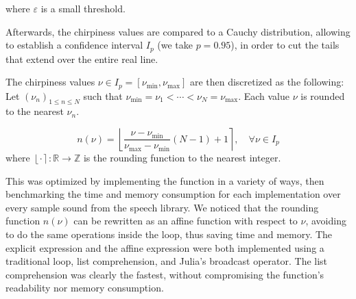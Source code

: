 \documentclass[
  american,
]{article}
\begin{document}
where \(\varepsilon\) is a small threshold.

Afterwards, the chirpiness values are compared to a Cauchy distribution, allowing to establish
a confidence interval \(I_p\) (we take \(p=0.95\)), in order to cut the tails that extend
over the entire real line.

The chirpiness values \(\nu\in I_p=[\nu_{\min},\nu_{\max}]\) are then discretized as the following:
Let \((\nu_n)_{1\leq n\leq N}\) such that \(\nu_{\min}=\nu_1<\cdots<\nu_N=\nu_{\max}\).
Each value \(\nu\) is rounded to the nearest \(\nu_n\).

\begin{equation}
n(\nu) = \left\lfloor\frac{\nu - \nu_{\min}}{\nu_{\max}- \nu_{\min}}(N-1) + 1\right\rceil,\quad\forall\nu\in I_p
\end{equation}
where \(\left\lfloor\cdot\right\rceil:\mathbb{R}\rightarrow\mathbb{Z}\) is the rounding function to the nearest integer.

This was optimized by implementing the function in a variety of ways,
then benchmarking the time and memory consumption for each implementation
over every sample sound from the speech library.
We noticed that the rounding function \(n(\nu)\) can be rewritten
as an affine function with respect to \(\nu\), avoiding to do the same
operations inside the loop, thus saving time and memory.
The explicit expression and the affine expression were both implemented
using a traditional loop, list comprehension, and Julia's broadcast operator.
The list comprehension was clearly the fastest, without compromising
the function's readability nor memory consumption.
\end{document}
